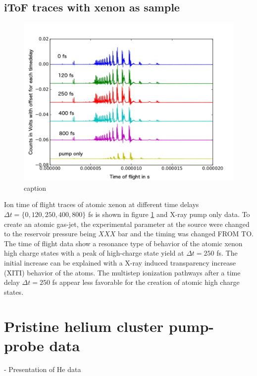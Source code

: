 \subsection{iToF traces with xenon as sample}
\begin{figure}
	\centering
		\includegraphics[width=1.00\textwidth]{images/results/TOF-atomic-xenon.png}
	\caption{caption}
	\label{fig:TOF-atomic-xenon}
\end{figure}
Ion time of flight traces of atomic xenon at different time delays $\Delta t = \{0, 120, 250, 400, 800\}$ fs is shown in figure \ref{fig:TOF-atomic-xenon} and X-ray pump only data. To create an atomic gas-jet, the experimental parameter at the source were changed to the reservoir pressure being $XXX$ bar and the timing was changed FROM TO. The time of flight data show a resonance type of behavior of the atomic xenon high charge states with a peak of high-charge state yield at $\Delta t = 250$ fs. The initial increase can be explained with a X-ray induced transparency increase (XITI) \citep{Schorb-2012-PRL} behavior of the atoms. The multistep ionization pathways after a time delay $\Delta t = 250$ fs appear less favorable for the creation of atomic high charge states.
%
%
%
\section{Pristine helium cluster pump-probe data}\label{sec:helium-data}
- Presentation of He data
